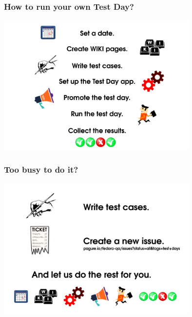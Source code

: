 \documentclass[12pt]{beamer}
\begin{document}
\begin{frame}
\frametitle{How to run your own Test Day?}
\begin{center}
	\includegraphics[width=10cm]{images/howtorun.png}
\end{center}

\end{frame}

\begin{frame}
\frametitle{Too busy to do it?}
\begin{center}
	\includegraphics[width=10cm]{images/toobusy.png}
\end{center}

\end{frame}
\end{document}
